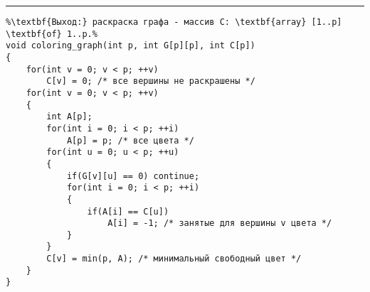 \documentclass{article}
\begin{document}
\vspace{5pt} \hrule
\begin{lstlisting}[caption={Алгоритм последовательного раскрашивания}, label=p359, escapechar=\%]
%\noindent\textbf{Вход:} граф G.\\%
%\textbf{Выход:} раскраска графа - массив C: \textbf{array} [1..p] \textbf{of} 1..p.%
void coloring_graph(int p, int G[p][p], int C[p])
{
	for(int v = 0; v < p; ++v)
		C[v] = 0; /* все вершины не раскрашены */
	for(int v = 0; v < p; ++v)
	{
		int A[p];
		for(int i = 0; i < p; ++i)
			A[p] = p; /* все цвета */
		for(int u = 0; u < p; ++u)
		{
			if(G[v][u] == 0) continue;
			for(int i = 0; i < p; ++i)
			{
				if(A[i] == C[u])
					A[i] = -1; /* занятые для вершины v цвета */
			}
		}
		C[v] = min(p, A); /* минимальный свободный цвет */
	}
}
\end{lstlisting}
\end{document}
